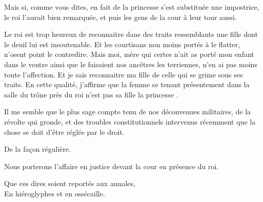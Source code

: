 \begin{drama}
  \nobleTwospeaks Mais si, comme vous dites, en fait de la princesse \princesse{} s’est substituée une impostrice, le roi l’aurait bien remarquée, et puis les gens de la cour à leur tour aussi.

  \reinespeaks Le roi est trop heureux de reconnaitre dans des traits ressemblants  une fille dont le deuil lui est insoutenable. Et les courtisans non moins portés à le flatter, n’osent point le contredire. Mais moi, mère qui certes n’ait as porté mon enfant dans le ventre ainsi que le faisaient nos ancêtres les terriennes, n’en ai pas moins toute l’affection. Et je sais reconnaitre ma fille de celle qui se grime sous ses traits. En cette qualité, j’affirme que la femme se tenant présentement dans la salle du trône près du roi n’est pas sa fille la princesse \princesse{}.

  \nobleTreespeaks Il me semble que le plus sage compte tenu de nos déconvenues militaires, de la révolte qui gronde, et des troubles constitutionnels intervenus récemment que la chose se doit d’être réglée par le droit.

  \nobleOnespeaks De la façon régulière.

  \nobleTwospeaks Nous porterons l’affaire en justice devant la cour en présence du roi.

  \begin{minipage}[t]{\linewidth}
    Que ces dires soient reportés aux annales,\\
    En hiéroglyphes et en ossécaille.
  \end{minipage}

\end{drama}

\scene

\StageDirII{\roi, \reine, \nobleOne, \nobleTwo, \nobleTree, \ela, \vladimir, \huissier, \greffier}






